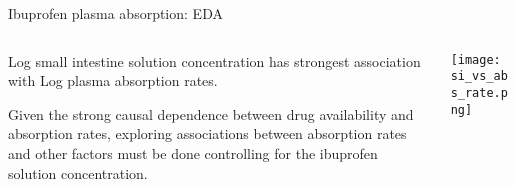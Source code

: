 \documentclass[handout]{beamer}
\begin{document}
\begin{frame}{Ibuprofen plasma absorption: EDA}
\small
\begin{columns}
\begin{column}{.5\textwidth}

Log small intestine solution concentration has strongest association with Log plasma absorption rates.

\bigskip

Given the strong causal dependence between drug availability and absorption rates, exploring associations between absorption rates and other factors must be done controlling for the ibuprofen solution concentration.


\end{column}
\begin{column}{.5\textwidth}
\centering
\texttt{[image: si\_vs\_abs\_rate.png]}
\end{column}
\end{columns}
\end{frame}




\end{document}
